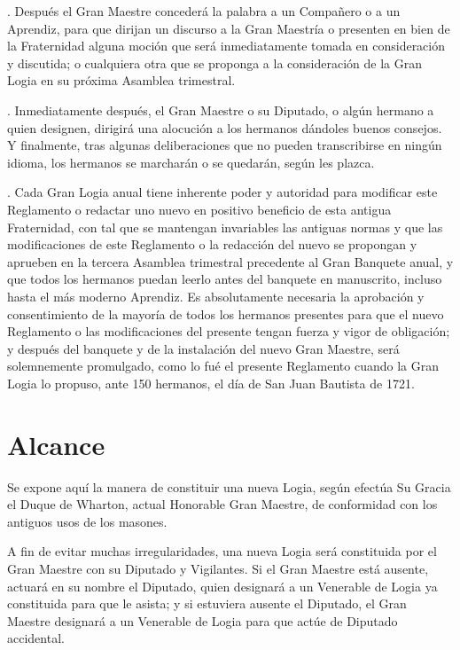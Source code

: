 \documentclass[a4paper,12pt,twoside]{book}
\newcommand{\manuscritosection}[1]{%
\section*{#1}
\addcontentsline{toc}{section}{#1}
}
\begin{document}
\vspace{0.3cm}

. Después el Gran Maestre concederá la palabra a un Compañero o a un Aprendiz, para que dirijan un discurso a la Gran Maestría o presenten en bien de la Fraternidad alguna moción que será inmediatamente tomada en consideración y discutida; o cualquiera otra que se proponga a la consideración de la Gran Logia en su próxima Asamblea trimestral.

\vspace{0.3cm}

. Inmediatamente después, el Gran Maestre o su Diputado, o algún hermano a quien designen, dirigirá una alocución a los hermanos dándoles buenos consejos. Y finalmente, tras algunas deliberaciones que no pueden transcribirse en ningún idioma, los hermanos se marcharán o se quedarán, según les plazca.

\vspace{0.3cm}

. Cada Gran Logia anual tiene inherente poder y autoridad para modificar este Reglamento o redactar uno nuevo en positivo beneficio de esta antigua Fraternidad, con tal que se mantengan invariables las antiguas normas y que las modificaciones de este Reglamento o la redacción del nuevo se propongan y aprueben en la tercera Asamblea trimestral precedente al Gran Banquete anual, y que todos los hermanos puedan leerlo antes del banquete en manuscrito, incluso hasta el más moderno Aprendiz. Es absolutamente necesaria la aprobación y consentimiento de la mayoría de todos los hermanos presentes para que el nuevo Reglamento o las modificaciones del presente tengan fuerza y vigor de obligación; y después del banquete y de la instalación del nuevo Gran Maestre, será solemnemente promulgado, como lo fué el presente Reglamento cuando la Gran Logia lo propuso, ante 150 hermanos, el día de San Juan Bautista de 1721.

\manuscritosection{Alcance}

Se expone aquí la manera de constituir una nueva Logia, según efectúa Su Gracia el Duque de Wharton, actual Honorable Gran Maestre, de conformidad con los antiguos usos de los masones.

A fin de evitar muchas irregularidades, una nueva Logia será constituida por el Gran Maestre con su Diputado y Vigilantes. Si el Gran Maestre está ausente, actuará en su nombre el Diputado, quien designará a un Venerable de Logia ya constituida para que le asista; y si estuviera ausente el Diputado, el Gran Maestre designará a un Venerable de Logia para que actúe de Diputado accidental.
\end{document}
